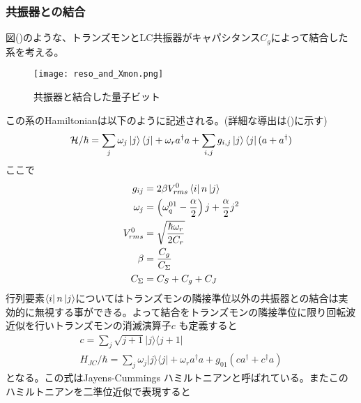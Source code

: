         \subsubsection{共振器との結合}
        図()のような、トランズモンとLC共振器がキャパシタンス$C_g$によって結合した系を考える。
        \begin{figure}[H]
            \begin{center}
                \texttt{[image: reso\_and\_Xmon.png]}
                \caption{共振器と結合した量子ビット}
            \end{center}
        \end{figure}
        この系のHamiltonianは以下のように記述される。(詳細な導出は()に示す)
        \begin{equation}
            \mathcal{H} / \hbar=\sum_{j} \omega_{j}\ket{j}\bra{j}+\omega_{r} a^{\dagger} a+\sum_{i, j} g_{i, j}\ket{j}\bra{j}(a+a^{\dagger})
        \end{equation}
        ここで
        \begin{equation}
            \begin{aligned}
            g_{i j} &=2 \beta V_{r m s}^{0}\bra{i}n\ket{j}\\
            \omega_{j} &=\left(\omega_{q}^{01}-\frac{\alpha}{2}\right) j+\frac{\alpha}{2} j^{2} \\
            V_{r m s}^{0} &=\sqrt{\frac{\hbar \omega_{r}}{2 C_{r}}} \\
            \beta &=\frac{C_{g}}{C_{\Sigma}} \\
            C_{\Sigma} &=C_{S}+C_{g}+C_{J}
            \end{aligned}
        \end{equation}
        行列要素$\bra{i}n\ket{j}$についてはトランズモンの隣接準位以外の共振器との結合は実効的に無視する事ができる。よって結合をトランズモンの隣接準位に限り回転波近似を行いトランズモンの消滅演算子$c$ も定義すると
        \begin{equation}
            \begin{array}{c}
            c=\sum_{j} \sqrt{j+1}|j\rangle\langle j+1| \\
            H_{J C} / \hbar=\sum_{j} \omega_{j}|j\rangle\langle j|+\omega_{r} a^{\dagger} a+g_{01}\left(c a^{\dagger}+c^{\dagger} a\right)
            \end{array}
            \end{equation}
        となる。この式はJayens-Cummings ハミルトニアンと呼ばれている。またこのハミルトニアンを二準位近似で表現すると
